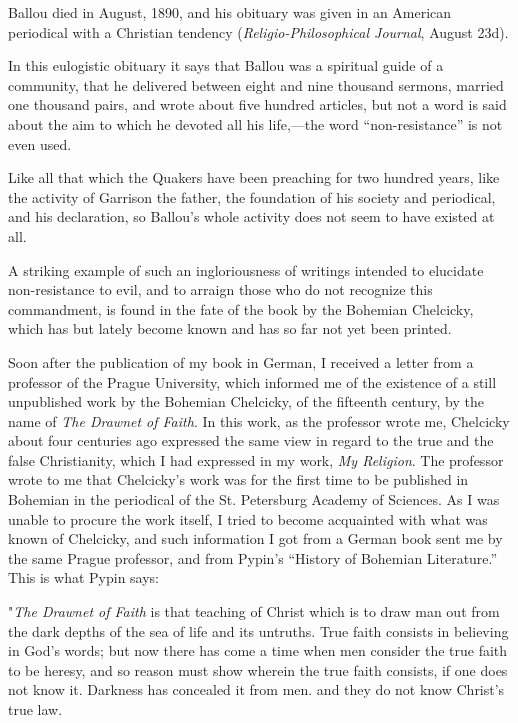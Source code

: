 \documentclass{book}
\begin{document}
Ballou died in August, 1890, and his obituary was given in an American periodical with a Christian tendency (\emph{Religio-Philosophical Journal}, August 23d).

In this eulogistic obituary it says that Ballou was a spiritual guide of a community, that he delivered between eight and nine thousand sermons, married one thousand pairs, and wrote about five hundred articles, but not a word is said about the aim to which he devoted all his life,—the word “non-resistance” is not even used.

Like all that which the Quakers have been preaching for two hundred years, like the activity of Garrison the father, the foundation of his society and periodical, and his declaration, so Ballou’s whole activity does not seem to have existed at all.

A striking example of such an ingloriousness of writings intended to elucidate non-resistance to evil, and to arraign those who do not recognize this commandment, is found in the fate of the book by the Bohemian Chelcicky, which has but lately become known and has so far not yet been printed.

Soon after the publication of my book in German, I received a letter from a professor of the Prague University, which informed me of the existence of a still unpublished work by the Bohemian Chelcicky, of the fifteenth century, by the name of \emph{The Drawnet of Faith}. In this work, as the professor wrote me, Chelcicky about four centuries ago expressed the same view in regard to the true and the false Christianity, which I had expressed in my work, \emph{My Religion}. The professor wrote to me that Chelcicky’s work was for the first time to be published in Bohemian in the periodical of the St. Petersburg Academy of Sciences. As I was unable to procure the work itself, I tried to become acquainted with what was known of Chelcicky, and such information I got from a German book sent me by the same Prague professor, and from Pypin’s “History of Bohemian Literature.” This is what Pypin says:

"\emph{The Drawnet of Faith} is that teaching of Christ which is to draw man out from the dark depths of the sea of life and its untruths. True faith consists in believing in God’s words; but now there has come a time when men consider the true faith to be heresy, and so reason must show wherein the true faith consists, if one does not know it. Darkness has concealed it from men. and they do not know Christ’s true law.
\end{document}
